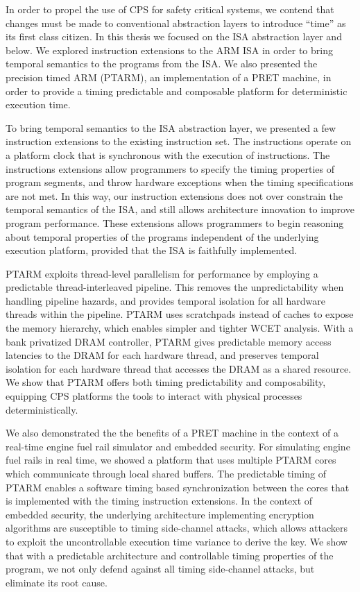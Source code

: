 In order to propel the use of CPS for safety critical systems, we contend that changes must be made to conventional abstraction layers to introduce ``time'' as its first class citizen.
In this thesis we focused on the ISA abstraction layer and below.  
We explored instruction extensions to the ARM ISA in order to bring temporal semantics to the programs from the ISA.  
We also presented the precision timed ARM (PTARM), an implementation of a PRET machine, in order to provide a timing predictable and composable platform for deterministic execution time.  

To bring temporal semantics to the ISA abstraction layer, we presented a few instruction extensions to the existing instruction set. 
The instructions operate on a platform clock that is synchronous with the execution of instructions. 
The instructions extensions allow programmers to specify the timing properties of program segments, and throw hardware exceptions when the timing specifications are not met.
In this way, our instruction extensions does not over constrain the temporal semantics of the ISA, and still allows architecture innovation to improve program performance. 
These extensions allows programmers to begin reasoning about temporal properties of the programs independent of the underlying execution platform, provided that the ISA is faithfully implemented.

PTARM exploits thread-level parallelism for performance by employing a predictable thread-interleaved pipeline. 
This removes the unpredictability when handling pipeline hazards, and provides temporal isolation for all hardware threads within the pipeline.
PTARM uses scratchpads instead of caches to expose the memory hierarchy, which enables simpler and tighter WCET analysis. 
With a bank privatized DRAM controller, PTARM gives predictable memory access latencies to the DRAM for each hardware thread, and preserves temporal isolation for each hardware thread that accesses the DRAM as a shared resource.
We show that PTARM offers both timing predictability and composability, equipping CPS platforms the tools to interact with physical processes deterministically.

We also demonstrated the the benefits of a PRET machine in the context of a real-time engine fuel rail simulator and embedded security.
For simulating engine fuel rails in real time, we showed a platform that uses multiple PTARM cores which communicate through local shared buffers. 
The predictable timing of PTARM enables a software timing based synchronization between the cores that is implemented with the timing instruction extensions.  
In the context of embedded security, the underlying architecture implementing encryption algorithms are susceptible to timing side-channel attacks, which allows attackers to exploit the uncontrollable execution time variance to derive the key. 
We show that with a predictable architecture and controllable timing properties of the program, we not only defend against all timing side-channel attacks, but eliminate its root cause. 


